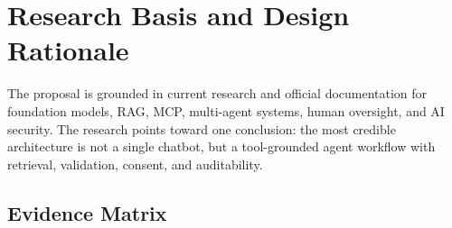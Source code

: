 \section{Research Basis and Design Rationale}

The proposal is grounded in current research and official documentation for foundation models, RAG, MCP, multi-agent systems, human oversight, and AI security. The research points toward one conclusion: the most credible architecture is not a single chatbot, but a tool-grounded agent workflow with retrieval, validation, consent, and auditability.

\subsection{Evidence Matrix}

